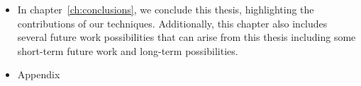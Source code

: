 \begin{itemize}
	\item In chapter~\ref{ch:conclusions}, we conclude this thesis, highlighting the contributions of our techniques. 
	Additionally, this chapter also includes several future work possibilities that can arise from this thesis including some short-term future work and long-term possibilities.  
	
	\item Appendix
	
\end{itemize}
